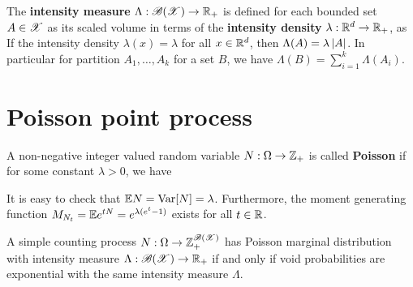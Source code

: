 \documentclass[letterpaper,10pt,english]{article}
\begin{document}
\begin{defn}
The \textbf{intensity measure} $\Lambda:\mathscr{B}(\mathscr{X})\to\mathbb{R}_+$ is defined for each bounded set $A \in \mathscr{X}$ as its scaled volume 
in terms of the \textbf{intensity density} $\lambda: \mathbb{R}^d \to \mathbb{R}_+$, as 
If the intensity density $\lambda(x) = \lambda$ for all $x \in \mathbb{R}^d$, then $\Lambda(A) = \lambda\left\lvert A\right\rvert$. 
In particular for partition $A_1, \dots, A_k$ for a set $B$, we have $\Lambda(B) = \sum_{i=1}^k\Lambda(A_i)$. 
\end{defn}
\section{Poisson point process}
\begin{defn}
A non-negative integer valued random variable $N: \Omega \to \mathbb{Z}_+$ is called \textbf{Poisson} if 
for some constant $\lambda > 0$, we have 
\end{defn}
\begin{rem}
It is easy to check that $\mathbb{E} N = \operatorname{Var}[N] = \lambda$. 
Furthermore, the moment generating function $M_{N_t} = \mathbb{E} e^{t N} = e^{\lambda(e^{t} - 1)}$ exists for all $t \in \mathbb{R}$. 
\end{rem}
\begin{cor}
\label{cor:ExpPoisson}
A simple counting process $N: \Omega \to \mathbb{Z}_+^{\mathscr{B}(\mathscr{X})}$ has Poisson marginal distribution with intensity measure $\Lambda:\mathscr{B}(\mathscr{X})\to\mathbb{R}_+$ if and only if void probabilities are exponential with the same intensity measure $\Lambda$. 
\end{cor}
\end{document}
